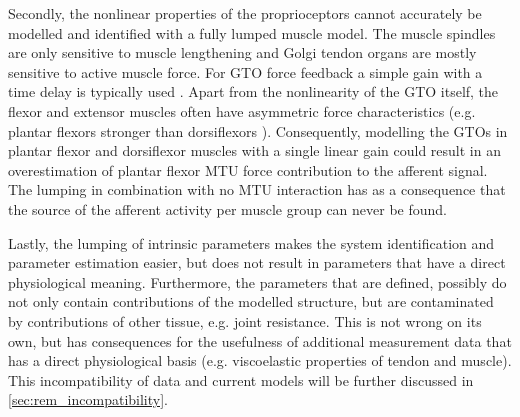 Secondly, the nonlinear properties of the proprioceptors cannot accurately be modelled and identified with a fully lumped muscle model. The muscle spindles are only sensitive to muscle lengthening and Golgi tendon organs are mostly sensitive to active muscle force. For GTO force feedback a simple gain with a time delay is typically used \cite{schouten_nmclab_2008, mugge_rigorous_2010}. Apart from the nonlinearity of the GTO itself, the flexor and extensor muscles often have asymmetric force characteristics (e.g. plantar flexors stronger than dorsiflexors \cite{fukunaga_specific_1996}). Consequently, modelling the GTOs in plantar flexor and dorsiflexor muscles with a single linear gain could result in an overestimation of plantar flexor MTU force contribution to the afferent signal. The lumping in combination with no MTU interaction has as a consequence that the source of the afferent activity per muscle group can never be found. 

Lastly, the lumping of intrinsic parameters makes the system identification and parameter estimation easier, but does not result in parameters that have a direct physiological meaning. Furthermore, the parameters that are defined, possibly do not only contain contributions of the modelled structure, but are contaminated by contributions of other tissue, e.g. joint resistance. This is not wrong on its own, but has consequences for the usefulness of additional measurement data that has a direct physiological basis (e.g. viscoelastic properties of tendon and muscle). This incompatibility of data and current models will be further discussed in \autoref{sec:rem_incompatibility}. 

\begin{landscape}



\end{landscape}

